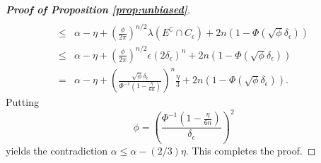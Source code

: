 \documentclass[11pt]{article}
\theoremstyle{plain}
\theoremstyle{definition}
\theoremstyle{remark}
\begin{document}
\begin{appendices}
\begin{proof}[\textbf{Proof of Proposition \ref{prop:unbiased}}]
\begin{equation*}
\begin{split}
            \\
            \leq&
            \alpha-\eta
            +
            \left(\frac{\phi}{2\pi}\right)^{n/2}\lambda(E^\complement\cap C_{\epsilon})
            +
            2n\left(1-\Phi(\sqrt \phi \delta_\epsilon)\right)
            \\
            \leq&
            \alpha-\eta
            +
            \left(\frac{\phi}{2\pi}\right)^{n/2}
            \epsilon
            (2\delta_\epsilon)^n
            +
            2n\left(1-\Phi(\sqrt \phi \delta_\epsilon)\right)
            \\
            =&
            \alpha-\eta
            +
            \left(\frac{\sqrt{\phi} \delta_{\epsilon}}{\Phi^{-1}\left(1-\frac{\eta}{6n}\right)}\right)^{n}
            \frac{\eta}{3}
            +
            2n\left(1-\Phi(\sqrt \phi \delta_\epsilon)\right).
        \end{split}
    \end{equation*}
    Putting 
    \begin{equation*}
        \phi = \left(\frac{\Phi^{-1}\left(1-\frac{\eta}{6n}\right)}{\delta_\epsilon}\right)^2
    \end{equation*}
    yields the contradiction $\alpha\leq \alpha-(2/3)\eta$.
    This completes the proof.

\end{proof}



\end{appendices}
\end{document}
